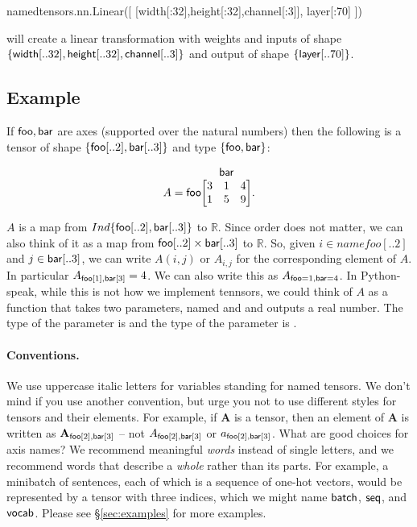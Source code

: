 \documentclass{article}
\makeatletter
\newcommand{\nmatrix}[3]{\name{#1}\begin{array}[b]{@{}c@{}}\name{#2}\\\begin{bmatrix}#3\end{bmatrix}\end{array}}
\makeatother
\begin{document}
\begin{python}
namedtensors.nn.Linear([ [width[:32],height[:32],channel[:3]], layer[:70] ])
\end{python}

will create a linear transformation with weights and inputs of shape $\{ \mathsf{width}[..32], \mathsf{height}[..32],\mathsf{channel}[..3] \}$ and output of shape $\{ \mathsf{layer}[..70] \}$. 





\subsection{Example}


If $\mathsf{foo}, \mathsf{bar}$ are axes (supported over the natural numbers) then the following is a tensor of shape $\{ \mathsf{foo}[..2], \mathsf{bar}[..3] \}$ and type $\{ \mathsf{foo} , \mathsf{bar} \}$: 

\begin{equation*}
A = \nmatrix{foo}{bar}{
  3 & 1 & 4 \\
  1 & 5 & 9
}.
\end{equation*}


$A$ is a map from $Ind \{ \mathsf{foo}[..2] , \mathsf{bar}[..3] \}$ to $\mathbb{R}$. Since order does not matter, we can also think of it as a map from $\mathsf{foo}[..2] \times \mathsf{bar}[..3]$ to $\mathbb{R}$.
So, given $i \in name{foo}[..2]$ and $j \in \mathsf{bar}[..3]$, we can write $A(i,j)$ or $A_{i,j}$ for the corresponding element of $A$.
In particular $A_{\mathsf{foo}[1],\mathsf{bar}[3]}=4$. We can also write this as $A_{\mathsf{foo}=1,\mathsf{bar}=4}$. In Python-speak, while this is not how we implement tennsors, we could think of $A$ as a function that takes two parameters, named  and  and outputs a real number. The type of the parameter  is  and the type of the parameter  is .



\paragraph{Conventions.}
We use uppercase italic letters for variables standing for named tensors. We don't mind if you use another convention, but urge you not to use different styles for tensors and their elements. For example, if $\mathbf{A}$ is a tensor, then an element of $\mathbf{A}$ is written as $\mathbf{A}_{\mathsf{foo}[2], \mathsf{bar}[3]}$ -- 
not $A_{\mathsf{foo}[2],\mathsf{bar}[3]}$ or $a_{\mathsf{foo}[2],\mathsf{bar}[3]}$.
What are good choices for axis names? We recommend meaningful \emph{words} instead of single letters, and we recommend words that describe a \emph{whole} rather than its parts. For example, a minibatch of sentences, each of which is a sequence of one-hot vectors, would be represented by a tensor with three indices, which we might name $\mathsf{batch}$, $\mathsf{seq}$, and $\mathsf{vocab}$. Please see \S\ref{sec:examples} for more examples.
\end{document}

